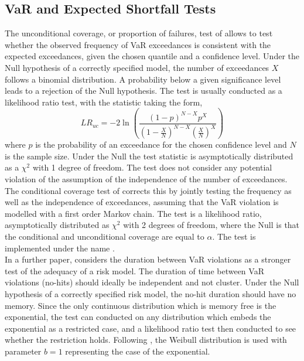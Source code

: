 \subsection{VaR and Expected Shortfall Tests}
The unconditional coverage, or proportion of failures, test of \cite{Kupiec1995}
allows to test whether the observed frequency of VaR exceedances is consistent with
the expected exceedances, given the chosen quantile and a confidence level. Under
the Null hypothesis of a correctly specified model, the number of exceedances \(X\)
follows a binomial distribution. A probability below a given significance level
leads to a rejection of the Null hypothesis. The test is usually conducted as a
likelihood ratio test, with the statistic taking the form,
\begin{equation}
L{R_{uc}} =  - 2\ln \left( {\frac{{{{\left( {1 - p} \right)}^{N - X}}{p^X}}}{{{{\left( {1 - \frac{X}{N}} \right)}^{N - X}}{{\left( {\frac{X}{N}} \right)}^X}}}} \right)
\end{equation}
where $p$ is the probability of an exceedance for the chosen confidence level
and $N$ is the sample size. Under the Null the test statistic is asymptotically
distributed as a $\chi^2$ with 1 degree of freedom. The test does not consider
any potential violation of the assumption of the independence of the number of
exceedances. The conditional coverage test of \cite{Christoffersen2001} corrects
this by jointly testing the frequency as well as the independence of exceedances,
assuming that the VaR violation is modelled with a first order Markov chain. The
test is a likelihood ratio, asymptotically distributed as $\chi^2$ with 2 degrees
of freedom, where the Null is  that the conditional and unconditional coverage are
equal to \( \alpha \). The test is implemented under the name \verb@VaRTest@.\\
In a further paper, \cite{Christoffersen2004} considers the duration between VaR
violations as a stronger test of the adequacy of a risk model. The duration of time
between VaR violations (no-hits) should ideally be independent and not cluster.
Under the Null hypothesis of a correctly specified risk model, the no-hit duration
should have no memory. Since the only continuous distribution which is memory free
is the exponential, the test can conducted on any distribution which embeds the
exponential as a restricted case, and a likelihood ratio test then conducted to
see whether the restriction holds. Following \cite{Christoffersen2004}, the Weibull
distribution is used with parameter $b=1$ representing the case of the exponential.
